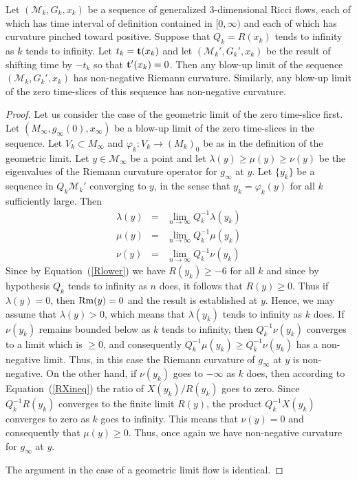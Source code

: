 \begin{theorem}\label{thm:blow-up-limit-nonnegative-curvature}

\label{blowupposcurv}

Let $({\mathcal M}_k,G_k,x_k)$ be a sequence of generalized $3$-dimensional
Ricci flows, each of which has time interval of definition contained in
$[0,\infty)$ and each of which has curvature pinched toward positive. Suppose
that $Q_k=R(x_k)$ tends to infinity as $k$ tends to infinity. Let $t_k={\bf
t}(x_k)$ and let $({\mathcal M}_k',G_k',x_k)$ be the result of shifting time by
$-t_k$ so that ${\bf t}'(x_k)=0$. Then any blow-up limit of the sequence
$({\mathcal M}_k,G_k',x_k)$ has non-negative Riemann curvature. Similarly, any
blow-up limit of the zero time-slices of this sequence has non-negative
curvature.
\end{theorem}

\begin{proof}
\sketch
{}
Let us consider the case of the geometric limit of the zero time-slice first.
Let $( M_\infty,g_\infty(0),x_\infty)$ be a blow-up limit of the zero
time-slices in the sequence. Let $V_k\subset M_\infty$ and $\varphi_k\colon
V_k\to (M_k)_0$ be as in the definition of the geometric limit. Let $y\in
{\mathcal M}_\infty$ be a point and let $\lambda(y)\ge \mu(y)\ge \nu(y)$ be the
eigenvalues of the Riemann curvature operator for $g_\infty$ at $y$. Let
$\{y_k\}$ be a sequence in $Q_k{\mathcal M}_k'$ converging to $y$, in the sense
that $y_k=\varphi_k(y)$ for all $k$ sufficiently large. Then
\begin{eqnarray*}
\lambda(y) & = & \lim_{n\rightarrow\infty}Q_k^{-1}\lambda(y_k) \\
\mu(y) & = & \lim_{n\rightarrow\infty}Q_k^{-1}\mu(y_k) \\
\nu(y) & = & \lim_{n\rightarrow\infty}Q_k^{-1}\nu(y_k)
\end{eqnarray*}
Since by Equation~(\ref{Rlower}) we have $R(y_k)\ge -6$ for all $k$ and since
by hypothesis $Q_k$ tends to infinity as $n$ does, it follows that $R(y)\ge 0$.
Thus if $\lambda(y)=0$, then $\operatorname{Rm}(y)=0$ and the result is established at
$y$. Hence, we may assume that $\lambda(y)>0$, which means that $\lambda(y_k)$
tends to infinity as $k$ does. If $\nu(y_k)$ remains bounded below as $k$ tends
to infinity, then $Q_k^{-1}\nu(y_k)$ converges to a limit which is $\ge 0$, and
consequently $Q_k^{-1}\mu(y_k)\ge Q_k^{-1}\nu(y_k)$ has a non-negative limit.
Thus, in this case the Riemann curvature of $g_\infty$ at $y$ is non-negative.
On the other hand, if $\nu(y_k)$ goes to $-\infty$ as $k$ does, then according
to Equation~(\ref{RXineq}) the ratio of $X(y_k)/R(y_k)$ goes to zero. Since
$Q_k^{-1}R(y_k)$ converges to the finite limit $R(y)$, the product
$Q_k^{-1}X(y_k)$ converges to zero as $k$ goes to infinity. This means that
$\nu(y)=0$ and consequently that $\mu(y)\ge 0$. Thus, once again we have
non-negative curvature for $g_\infty$ at $y$.

The argument in the case of a geometric limit flow is identical.
\end{proof}

